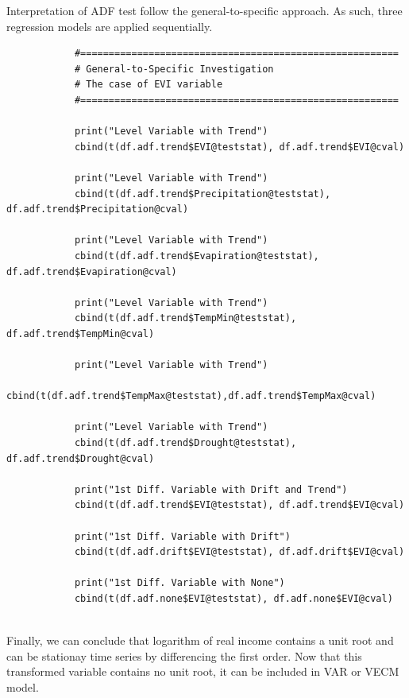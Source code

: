 \documentclass[12pt,a4paper]{book}
\begin{document}
			Interpretation of ADF test follow the general-to-specific approach. As such, three regression models are applied sequentially.
				\begin{verbatim}
			#========================================================
			# General-to-Specific Investigation
			# The case of EVI variable
			#========================================================
			
			print("Level Variable with Trend")
			cbind(t(df.adf.trend$EVI@teststat), df.adf.trend$EVI@cval)
			
			print("Level Variable with Trend")
			cbind(t(df.adf.trend$Precipitation@teststat), df.adf.trend$Precipitation@cval)
			
			print("Level Variable with Trend")
			cbind(t(df.adf.trend$Evapiration@teststat), df.adf.trend$Evapiration@cval)
			
			print("Level Variable with Trend")
			cbind(t(df.adf.trend$TempMin@teststat), df.adf.trend$TempMin@cval)
			
			print("Level Variable with Trend")
			cbind(t(df.adf.trend$TempMax@teststat),df.adf.trend$TempMax@cval)
			
			print("Level Variable with Trend")
			cbind(t(df.adf.trend$Drought@teststat), df.adf.trend$Drought@cval)
			
			print("1st Diff. Variable with Drift and Trend")
			cbind(t(df.adf.trend$EVI@teststat), df.adf.trend$EVI@cval)
			
			print("1st Diff. Variable with Drift")
			cbind(t(df.adf.drift$EVI@teststat), df.adf.drift$EVI@cval)
			
			print("1st Diff. Variable with None")
			cbind(t(df.adf.none$EVI@teststat), df.adf.none$EVI@cval)
			
				\end{verbatim}
	
			Finally, we can conclude that logarithm of real income contains a unit root and 
			can be stationay time series by differencing the first order. Now that this transformed
			 variable contains no unit root, it can be included in VAR or VECM model.
			
\end{document}
